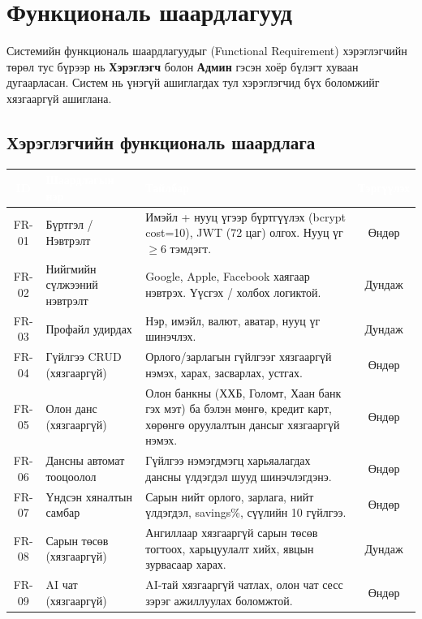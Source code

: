 \section{Функциональ шаардлагууд}
Системийн функциональ шаардлагуудыг (Functional Requirement) хэрэглэгчийн төрөл тус бүрээр нь \textbf{Хэрэглэгч} болон \textbf{Админ} гэсэн хоёр бүлэгт хуваан дугаарласан. Систем нь үнэгүй ашиглагдах тул хэрэглэгчид бүх боломжийг хязгааргүй ашиглана.

\subsection{Хэрэглэгчийн функциональ шаардлага}
\begin{table}[ht]
\centering
\footnotesize
\renewcommand{\arraystretch}{1.25}
\begin{tabular}{|c|p{3.7cm}|p{7cm}|c|}
\hline
\rowcolor{darknavy}
\textcolor{white}{\textbf{ID}} & \textcolor{white}{\textbf{Шаардлагын нэр}} & \textcolor{white}{\textbf{Тайлбар}} & \textcolor{white}{\textbf{Тэргүүлэх}} \\ \hline
FR-01 & Бүртгэл / Нэвтрэлт          & Имэйл + нууц үгээр бүртгүүлэх (bcrypt cost=10), JWT (72 цаг) олгох. Нууц үг $\geq$6 тэмдэгт. & Өндөр \\ \hline
FR-02 & Нийгмийн сүлжээний нэвтрэлт & Google, Apple, Facebook хаягаар нэвтрэх. Үүсгэх / холбох логиктой. & Дундаж \\ \hline
FR-03 & Профайл удирдах             & Нэр, имэйл, валют, аватар, нууц үг шинэчлэх. & Дундаж \\ \hline
FR-04 & Гүйлгээ CRUD (хязгааргүй)   & Орлого/зарлагын гүйлгээг хязгааргүй нэмэх, харах, засварлах, устгах. & Өндөр \\ \hline
FR-05 & Олон данс (хязгааргүй)      & Олон банкны (ХХБ, Голомт, Хаан банк гэх мэт) ба бэлэн мөнгө, кредит карт, хөрөнгө оруулалтын дансыг хязгааргүй нэмэх. & Өндөр \\ \hline
FR-06 & Дансны автомат тооцоолол    & Гүйлгээ нэмэгдмэгц харьяалагдах дансны үлдэгдэл шууд шинэчлэгдэнэ. & Өндөр \\ \hline
FR-07 & Үндсэн хяналтын самбар      & Сарын нийт орлого, зарлага, нийт үлдэгдэл, savings\%, сүүлийн 10 гүйлгээ. & Өндөр \\ \hline
FR-08 & Сарын төсөв (хязгааргүй)    & Ангиллаар хязгааргүй сарын төсөв тогтоох, харьцуулалт хийх, явцын зурвасаар харах. & Дундаж \\ \hline
FR-09 & AI чат (хязгааргүй)         & AI-тай хязгааргүй чатлах, олон чат сесс зэрэг ажиллуулах боломжтой. & Өндөр \\ \hline

\end{tabular}
\end{table}
